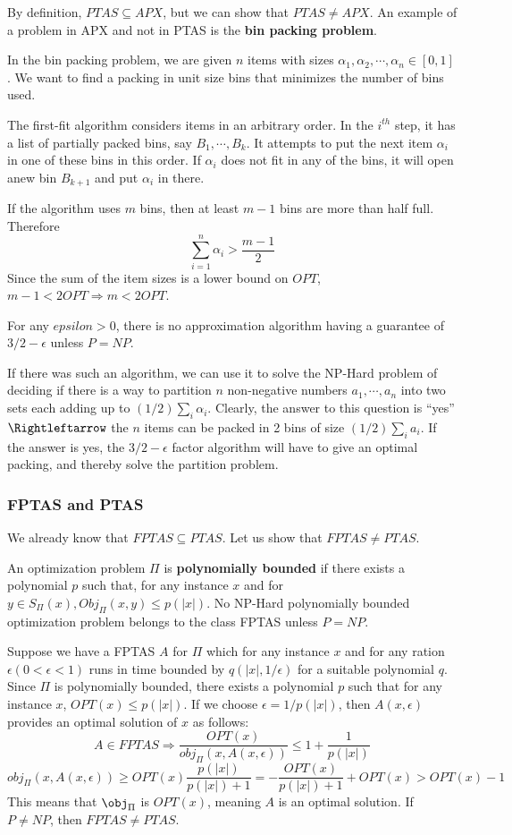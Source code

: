 \documentclass[12pt,letterpaper]{article}
\theoremstyle{definition}
\begin{document}
By definition, $PTAS \subseteq APX$, but we can show that $PTAS \neq APX$. An example of a problem in APX and not in PTAS is the \textbf{bin packing problem}.

In the bin packing problem, we are given $n$ items with sizes $\alpha_1, \alpha_2, \cdots, \alpha_n \in [0,1]$. We want to find a packing in unit size bins that minimizes the number of bins used.

The first-fit algorithm considers items in an arbitrary order. In the $i^{th}$ step, it has a list of partially packed bins, say $B_1, \cdots, B_k$. It attempts to put the next item $\alpha_i$ in one of these bins in this order. If $\alpha_i$ does not fit in any of the bins, it will open anew bin $B_{k+1}$ and put $\alpha_i$ in there.

If the algorithm uses $m$ bins, then at least $m-1$ bins are more than half full. Therefore
\[\sum_{i=1}^n \alpha_i > \frac{m-1}{2}\]
Since the sum of the item sizes is a lower bound on $OPT$, $m-1 < 2 OPT \Rightarrow m < 2 OPT$.

For any $epsilon > 0$, there is no approximation algorithm having a guarantee of $3/2 - \epsilon$ unless $P = NP$.

If there was such an algorithm, we can use it to solve the NP-Hard problem of deciding if there is a way to partition $n$ non-negative numbers $a_1, \cdots, a_n$ into two sets each adding up to $(1/2) \sum_i \alpha_i$. Clearly, the answer to this question is ``yes'' $\Rightleftarrow$ the $n$ items can be packed in 2 bins of size $(1/2) \sum_i a_i$. If the answer is yes, the $3/2 - \epsilon$ factor algorithm will have to give an optimal packing, and thereby solve the partition problem.

\subsubsection{FPTAS and PTAS}

We already know that $FPTAS \subseteq PTAS$. Let us show that $FPTAS \neq PTAS$.

An optimization problem $\Pi$ is \textbf{polynomially bounded} if there exists a polynomial $p$ such that, for any instance $x$ and for $y \in S_\Pi(x), Obj_\Pi(x,y) \leq p(|x|)$. No NP-Hard polynomially bounded optimization problem belongs to the class FPTAS unless $P=NP$.

Suppose we have a FPTAS $A$ for $\Pi$ which for any instance $x$ and for any ration $\epsilon (0 < \epsilon < 1)$  runs in time bounded by $q(|x|, 1/\epsilon)$ for a suitable polynomial $q$. Since $\Pi$ is polynomially bounded, there exists a polynomial $p$ such that for any instance $x$, $OPT(x) \leq p(|x|)$. If we choose $\epsilon = 1/p(|x|)$, then $A(x,\epsilon)$ provides an optimal solution of $x$ as follows:
\[A \in FPTAS \Rightarrow \frac{OPT(x)}{obj_\Pi(x,A(x,\epsilon))} \leq 1 + \frac{1}{p(|x|)}\]
\[obj_\Pi (x,A(x,\epsilon)) \geq OPT(x) \frac{p(|x|)}{p(|x|) + 1} = - \frac{OPT(x)}{p(|x|)+1} + OPT(x) > OPT(x) - 1\]
This means that $\obj_\Pi$ is $OPT(x)$, meaning $A$ is an optimal solution. If $P \neq NP$, then $FPTAS \neq PTAS$.
\end{document}
